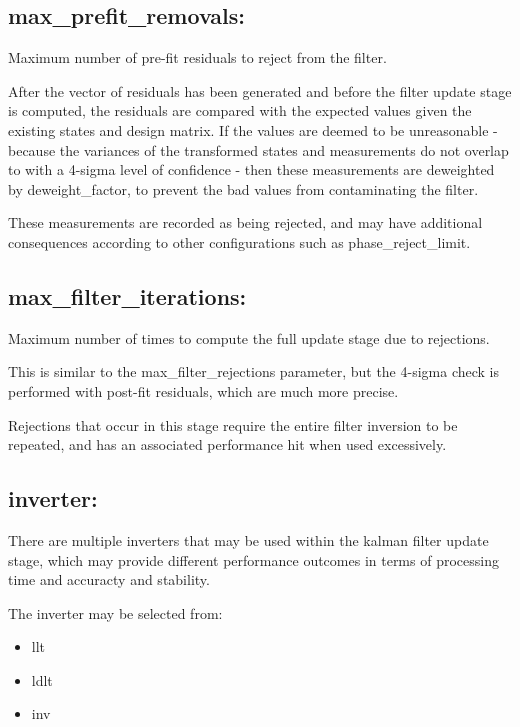 \subsection*{max\_prefit\_removals:}

Maximum number of pre-fit residuals to reject from the filter.

After the vector of residuals has been generated and before the filter update stage is computed, the residuals are compared with the expected values given the existing states and design matrix.
If the values are deemed to be unreasonable - because the variances of the transformed states and measurements do not overlap to with a 4-sigma level of confidence - then these measurements are deweighted by deweight\_factor, to prevent the bad values from contaminating the filter.

These measurements are recorded as being rejected, and may have additional consequences according to other configurations such as phase\_reject\_limit.

\subsection*{max\_filter\_iterations:}

Maximum number of times to compute the full update stage due to rejections.

This is similar to the max\_filter\_rejections parameter, but the 4-sigma check is performed with post-fit residuals, which are much more precise.

Rejections that occur in this stage require the entire filter inversion to be repeated, and has an associated performance hit when used excessively.


\subsection*{inverter:}

There are multiple inverters that may be used within the kalman filter update stage, which may provide different performance outcomes in terms of processing time and accuracty and stability.

The inverter may be selected from:
\begin{itemize}
\item llt
\item ldlt
\item inv
\end {itemize}



